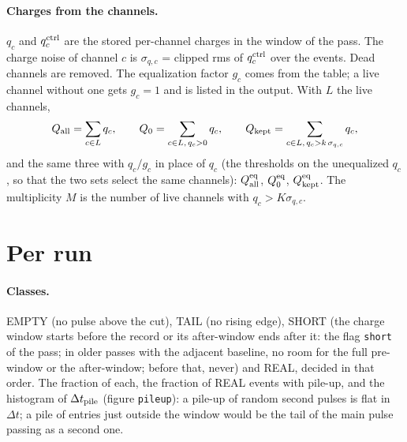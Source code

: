 \documentclass[11pt]{article}
\newcommand{\code}[1]{\texttt{#1}}
\begin{document}
\paragraph{Charges from the channels.} $q_c$ and $q_c^{\rm ctrl}$ are the
stored per-channel charges in the window of the pass. The charge noise of
channel $c$ is $\sigma_{q,c}$ = clipped rms of $q_c^{\rm ctrl}$ over the
events. Dead channels are removed. The equalization factor $g_c$ comes
from the table; a live channel without one gets $g_c = 1$ and is listed in
the output. With $L$ the live channels,
\[
  Q_{\rm all} = \sum_{c \in L} q_c, \qquad
  Q_0 = \sum_{c \in L,\, q_c > 0} q_c, \qquad
  Q_{\rm kept} = \sum_{c \in L,\, q_c > k\,\sigma_{q,c}} q_c,
\]
and the same three with $q_c / g_c$ in place of $q_c$ (the thresholds on
the unequalized $q_c$, so that the two sets select the same channels):
$Q^{\rm eq}_{\rm all}$, $Q^{\rm eq}_0$, $Q^{\rm eq}_{\rm kept}$. The
multiplicity $M$ is the number of live channels with $q_c > K\sigma_{q,c}$.

\section{Per run}

\paragraph{Classes.} EMPTY (no pulse above the cut), TAIL (no rising
edge), SHORT (the charge window starts before the record or its
after-window ends after it: the flag \code{short} of the pass; in older
passes with the adjacent baseline, no room for the full pre-window or the
after-window; before that, never) and REAL, decided in that order.
The fraction of each, the
fraction of REAL events with pile-up, and the histogram of $\Delta t_{\rm
pile}$ (figure \code{pileup}): a pile-up of random second pulses is flat
in $\Delta t$; a pile of entries just outside the window would be the tail
of the main pulse passing as a second one.
\end{document}
